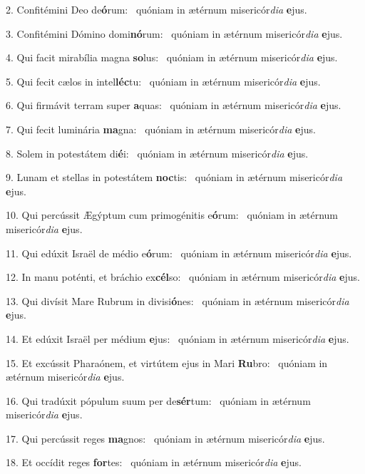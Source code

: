 2. Confitémini Deo de\textbf{ó}rum: \ast\  quóniam in ætérnum misericór\textit{di}\textit{a} \textbf{e}jus.\

3. Confitémini Dómino domi\textbf{nó}rum: \ast\  quóniam in ætérnum misericór\textit{di}\textit{a} \textbf{e}jus.\

4. Qui facit mirabília magna \textbf{so}lus: \ast\  quóniam in ætérnum misericór\textit{di}\textit{a} \textbf{e}jus.\

5. Qui fecit cælos in intel\textbf{léc}tu: \ast\  quóniam in ætérnum misericór\textit{di}\textit{a} \textbf{e}jus.\

6. Qui firmávit terram super \textbf{a}quas: \ast\  quóniam in ætérnum misericór\textit{di}\textit{a} \textbf{e}jus.\

7. Qui fecit luminária \textbf{ma}gna: \ast\  quóniam in ætérnum misericór\textit{di}\textit{a} \textbf{e}jus.\

8. Solem in potestátem di\textbf{é}i: \ast\  quóniam in ætérnum misericór\textit{di}\textit{a} \textbf{e}jus.\

9. Lunam et stellas in potestátem \textbf{noc}tis: \ast\  quóniam in ætérnum misericór\textit{di}\textit{a} \textbf{e}jus.\

10. Qui percússit Ægýptum cum primogénitis e\textbf{ó}rum: \ast\  quóniam in ætérnum misericór\textit{di}\textit{a} \textbf{e}jus.\

11. Qui edúxit Israël de médio e\textbf{ó}rum: \ast\  quóniam in ætérnum misericór\textit{di}\textit{a} \textbf{e}jus.\

12. In manu poténti, et bráchio ex\textbf{cél}so: \ast\  quóniam in ætérnum misericór\textit{di}\textit{a} \textbf{e}jus.\

13. Qui divísit Mare Rubrum in divisi\textbf{ó}nes: \ast\  quóniam in ætérnum misericór\textit{di}\textit{a} \textbf{e}jus.\

14. Et edúxit Israël per médium \textbf{e}jus: \ast\  quóniam in ætérnum misericór\textit{di}\textit{a} \textbf{e}jus.\

15. Et excússit Pharaónem, et virtútem ejus in Mari \textbf{Ru}bro: \ast\  quóniam in ætérnum misericór\textit{di}\textit{a} \textbf{e}jus.\

16. Qui tradúxit pópulum suum per de\textbf{sér}tum: \ast\  quóniam in ætérnum misericór\textit{di}\textit{a} \textbf{e}jus.\

17. Qui percússit reges \textbf{ma}gnos: \ast\  quóniam in ætérnum misericór\textit{di}\textit{a} \textbf{e}jus.\

18. Et occídit reges \textbf{for}tes: \ast\  quóniam in ætérnum misericór\textit{di}\textit{a} \textbf{e}jus.\

